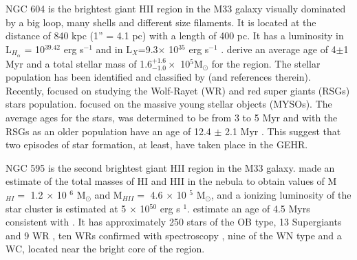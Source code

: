\documentclass[fleqn,usenatbib, useAMS, a4paper]{mnras}
\begin{document}
NGC 604 is the brightest giant HII region in the M33 galaxy visually dominated by a big loop, many shells and different size filaments.
It is located at the distance of 840 kpc (1'' = 4.1 pc) \citep{2015KamKinematics} with a length of 400 pc.
It has a luminosity in L$_{H_\alpha}$ = 10$^{39.42}$ erg s$^{-1}$ \citep{2002MNRAS.329..481B} and in L$_{X}$=9.3$\times$ 10$^{35}$ erg s$^{-1}$ \citep{2008ApJ...685..919T}.
\citet{2012ApJ...761....3M} derive an average age of 4$\pm$1 Myr and a total stellar mass of 1.6$^{+1.6}_{-1.0} \times$ 10$^{5}$M$_{\odot}$ for the region.
The stellar population has been identified and classified by \citet{1996ApJ...456..174H} (and references therein).
Recently, \citet{2011MNRAS.411..235E} focused on studying the Wolf-Rayet (WR) and red super giants (RSGs) stars population.
\citet{2012AJ....143...43F} focused on the massive young stellar objects (MYSOs).
The average ages for the stars, was determined to be from 3 to 5 Myr \citep{1996ApJ...456..174H} and with the RSGs as an older population have an age of 12.4 $\pm$ 2.1 Myr \citep{2011MNRAS.411..235E}.
This suggest that two episodes of star formation, at least, have taken place in the GEHR.

NGC 595 is the second brightest giant HII region in the M33 galaxy.
\citet{1983A&A...119..185V} made an estimate of the total masses of HI and HII in the nebula to obtain values of M$_{HI}=$ 1.2 $\times$ 10 $^{6}$ M$_{\odot}$ and M$_{HII} =$ 4.6 $\times$ 10 $^{5}$ M$_{\odot}$, and a ionizing luminosity of the star cluster is estimated at 5 $\times$ 10$^{50}$ erg s $^{1}$.
\citet{1996AJ....111.1128M} estimate an age of 4.5 Myrs consistent with \citet{1993AJ....105.1400D}.
It has approximately 250 stars of the OB type, 13 Supergiants and 9 WR \citep{1996AJ....111.1128M}, ten WRs confirmed with spectroscopy \citet{1993AJ....105.1400D}, nine of the WN type and a WC, located near the bright core of the region.
\end{document}

